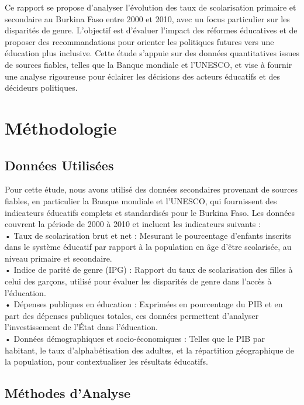 \documentclass[a4paper,12pt]{report}
\begin{document}
Ce rapport se propose d'analyser l'évolution des taux de scolarisation primaire et secondaire au Burkina Faso entre 2000 et 2010, avec un focus particulier sur les disparités de genre. L’objectif est d’évaluer l’impact des réformes éducatives et de proposer des recommandations pour orienter les politiques futures vers une éducation plus inclusive. Cette étude s’appuie sur des données quantitatives issues de sources fiables, telles que la Banque mondiale et l’UNESCO, et vise à fournir une analyse rigoureuse pour éclairer les décisions des acteurs éducatifs et des décideurs politiques.
\chapter*{Méthodologie}
\section{Données Utilisées}
Pour cette étude, nous avons utilisé des données secondaires provenant de sources fiables, en particulier la Banque mondiale et l’UNESCO, qui fournissent des indicateurs éducatifs complets et standardisés pour le Burkina Faso. Les données couvrent la période de 2000 à 2010 et incluent les indicateurs suivants :\\
•	Taux de scolarisation brut et net : Mesurant le pourcentage d’enfants inscrits dans le système éducatif par rapport à la population en âge d’être scolarisée, au niveau primaire et secondaire.\\
•	Indice de parité de genre (IPG) : Rapport du taux de scolarisation des filles à celui des garçons, utilisé pour évaluer les disparités de genre dans l’accès à l’éducation.\\
•	Dépenses publiques en éducation : Exprimées en pourcentage du PIB et en part des dépenses publiques totales, ces données permettent d’analyser l’investissement de l’État dans l’éducation.\\
•	Données démographiques et socio-économiques : Telles que le PIB par habitant, le taux d’alphabétisation des adultes, et la répartition géographique de la population, pour contextualiser les résultats éducatifs.\\
\section{Méthodes d’Analyse}
\end{document}
